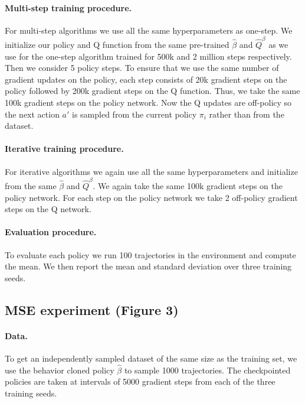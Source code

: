 \begin{subappendices}
\paragraph{Multi-step training procedure.} For multi-step algorithms we use all the same hyperparameters as one-step. We initialize our policy and Q function from the same pre-trained $ \hat \beta$ and $ \widehat Q^\beta$ as we use for the one-step algorithm trained for 500k and 2 million steps respectively. Then we consider 5 policy steps. To ensure that we use the same number of gradient updates on the policy, each step consists of 20k gradient steps on the policy followed by 200k gradient steps on the Q function. Thus, we take the same 100k gradient steps on the policy network. Now the Q updates are off-policy so the next action $a'$ is sampled from the current policy $ \pi_i$ rather than from the dataset.

\paragraph{Iterative training procedure.} For iterative algorithms we again use all the same hyperparameters and initialize from the same $ \hat \beta$ and $ \widehat Q^\beta$. We again take the same 100k gradient steps on the policy network. For each step on the policy network we take 2 off-policy gradient steps on the Q network.



\paragraph{Evaluation procedure.} To evaluate each policy we run 100 trajectories in the environment and compute the mean. We then report the mean and standard deviation over three training seeds.




\subsection{MSE experiment (Figure 3)}

\paragraph{Data.} To get an independently sampled dataset of the same size as the training set, we use the behavior cloned policy $ \hat \beta$ to sample 1000 trajectories. The checkpointed policies are taken at intervals of 5000 gradient steps from each of the three training seeds.


\end{subappendices}
